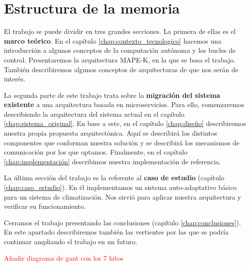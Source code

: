 \section{Estructura de la memoria}

El trabajo se puede dividir en tres grandes secciones. La primera de ellas es el \textbf{marco teórico}. En el capítulo \ref{chap:contexto_tecnologico} hacemos una introducción a algunos conceptos de la computación autónoma y los bucles de control. Presentaremos la arquitectura MAPE-K, en la que se basa el trabajo. También describiremos algunos conceptos de arquitecturas de  que nos serán de interés.

La segunda parte de este trabajo trata sobre la \textbf{migración del sistema existente} a una arquitectura basada en microservicios. Para ello, comenzaremos describiendo la arquitectura del sistema actual en el capítulo \ref{chap:sistema_original}. En base a este, en el capítulo \ref{chap:diseño} describiremos nuestra propia propuesta arquitectónica. Aquí se describirá los distintos componentes que conforman nuestra solución y se describirá los mecanismos de comunicación por los que optamos. Finalmente, en el capítulo \ref{chap:implementación} describimos nuestra implementación de referencia.

La última sección del trabajo es la referente al \textbf{caso de estudio} (capítulo \ref{chap:caso_estudio}). En él implementamos un sistema auto-adaptativo básico para un sistema de climatización. Nos sirvió para aplicar nuestra arquitectura y verificar su funcionamiento.

Cerramos el trabajo presentando las conclusiones (capítulo \ref{chap:conclusiones}). En este apartado describiremos también las vertientes por las que se podría continuar ampliando el trabajo en un futuro.



\textcolor{red}{Añadir diagrama de gant con los 7 hitos}
